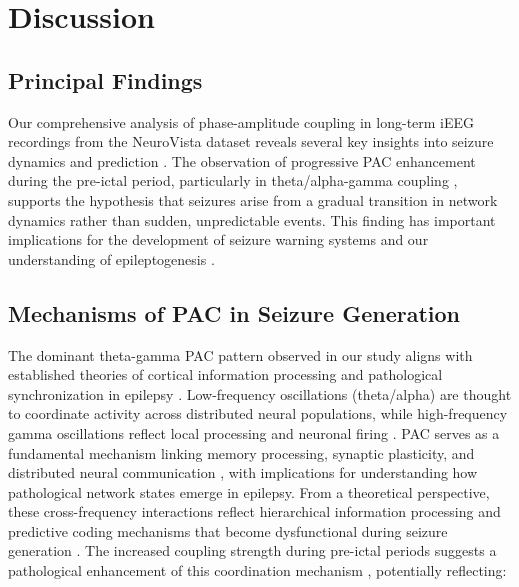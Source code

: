 
\section{Discussion}

\subsection{Principal Findings}
Our comprehensive analysis of phase-amplitude coupling in long-term iEEG recordings from the NeuroVista dataset reveals several key insights into seizure dynamics and prediction \cite{Kuhlmann2018SeizurePA,Freestone2015SeizurePSBF}. The observation of progressive PAC enhancement during the pre-ictal period, particularly in theta/alpha-gamma coupling \cite{Ahn2022TheFIT,Radiske2020CrossFrequencyPCAR,Ponzi2023ThetagammaPAAT}, supports the hypothesis that seizures arise from a gradual transition in network dynamics rather than sudden, unpredictable events. This finding has important implications for the development of seizure warning systems and our understanding of epileptogenesis \cite{Canolty2010TheFRC,Tort2010MeasuringPCE}.

\subsection{Mechanisms of PAC in Seizure Generation}
The dominant theta-gamma PAC pattern observed in our study aligns with established theories of cortical information processing and pathological synchronization in epilepsy \cite{Canolty2010TheFRC,Aru2014UntanglingCCD,Bergmann2018PhaseAmplitudeCAN}. Low-frequency oscillations (theta/alpha) are thought to coordinate activity across distributed neural populations, while high-frequency gamma oscillations reflect local processing and neuronal firing \cite{Tort2010MeasuringPCE,Hlsemann2019QuantificationOPA}. PAC serves as a fundamental mechanism linking memory processing, synaptic plasticity, and distributed neural communication \cite{Bergmann2018PhaseAmplitudeCAN}, with implications for understanding how pathological network states emerge in epilepsy. From a theoretical perspective, these cross-frequency interactions reflect hierarchical information processing and predictive coding mechanisms that become dysfunctional during seizure generation \cite{Friston2020GenerativeMLB}. The increased coupling strength during pre-ictal periods suggests a pathological enhancement of this coordination mechanism \cite{Zhang2017TemporalspatialCOAG,Miao2021SeizureOZBG}, potentially reflecting:

